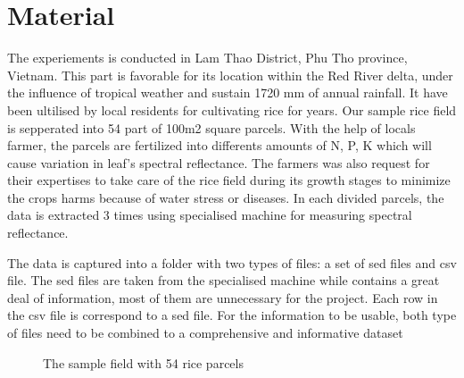 \section{Material} \label{material}
The experiements is conducted in Lam Thao District, Phu Tho province, Vietnam. This part is favorable for its location within the Red River delta, under the influence of tropical weather and sustain 1720 mm of annual rainfall. It have been ultilised by local residents for cultivating rice for years. Our sample rice field is sepperated into 54 part of 100m2 square parcels. With the help of locals farmer, the parcels are fertilized into differents amounts of N, P, K which will cause variation in leaf's spectral reflectance. The farmers was also request for their expertises to take care of the rice field during its growth stages to minimize the crops harms because of water stress or diseases. In each divided parcels, the data is extracted 3 times using specialised machine for measuring spectral reflectance.

The data is captured into a folder with two types of files: a set of sed files and csv file. The sed files are taken from the specialised machine while contains a great deal of information, most of them are unnecessary for the project. Each row in the csv file is correspond to a sed file. For the information to be usable, both type of files need to be combined to a comprehensive and informative dataset 


\begin{figure}[h]
\centering
\caption{The sample field with 54 rice parcels} \label{fig:rice-field}
\end{figure}
    
    

